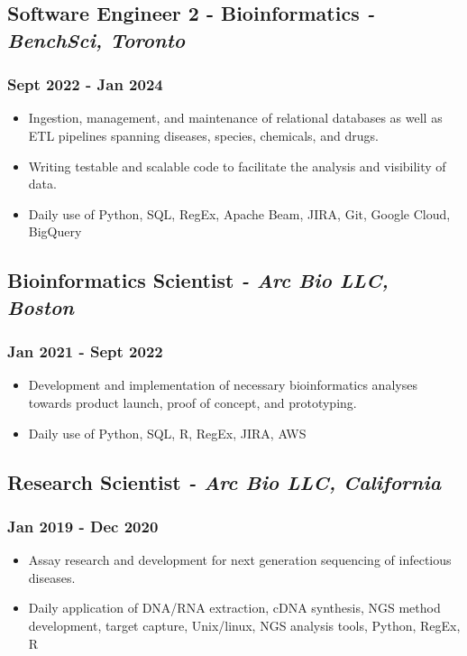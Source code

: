 \documentclass[11pt]{article}
\begin{document}
\subsection{Software Engineer 2 - Bioinformatics \normalfont\textit{- BenchSci, Toronto}}
\subsubsection{Sept 2022 - Jan 2024}
\begin{itemize}
    \item Ingestion, management, and maintenance of relational databases as well as ETL pipelines spanning diseases, species, chemicals, and drugs.
    \item Writing testable and scalable code to facilitate the analysis and visibility of data.
    \item Daily use of Python, SQL, RegEx, Apache Beam, JIRA, Git, Google Cloud, BigQuery
\end{itemize}
\bigskip


\subsection{Bioinformatics Scientist \normalfont\textit{- Arc Bio LLC, Boston}}
\subsubsection{Jan 2021 - Sept 2022}
\begin{itemize}
    \item Development and implementation of necessary bioinformatics analyses towards product launch, proof of
concept, and prototyping.
    \item Daily use of Python, SQL, R, RegEx, JIRA, AWS
\end{itemize}
\bigskip

\subsection{Research Scientist \normalfont\textit{- Arc Bio LLC, California}}
\subsubsection{Jan 2019 - Dec 2020}
\begin{itemize}
    \item Assay research and development for next generation sequencing of infectious diseases.
    \item Daily application of DNA/RNA extraction, cDNA synthesis, NGS method development, target capture, Unix/linux, NGS analysis tools, Python, RegEx, R
\end{itemize}
\bigskip
\end{document}

